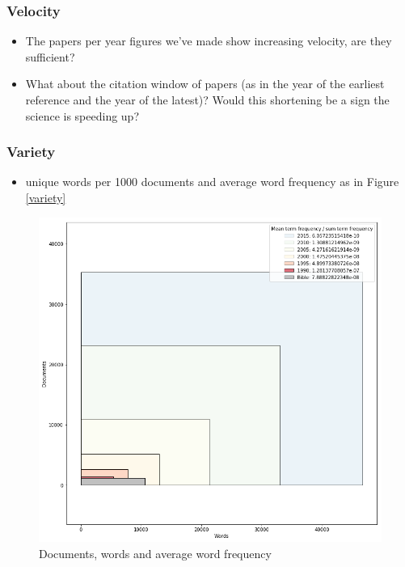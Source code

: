 \documentclass{article}
\begin{document}
\subsubsection*{Velocity}
\begin{itemize}
	\item The papers per year figures we've made show increasing velocity, are they sufficient?
    \item What about the citation window of papers (as in the year of the earliest reference and the year of the latest)? Would this shortening be a sign the science is speeding up?
\end{itemize}


\subsubsection*{Variety}

\begin{itemize}
	\item unique words per 1000 documents and average word frequency as in Figure \ref{variety}
\end{itemize}

\begin{figure}
\includegraphics[width=\linewidth]{plots/volume_variety_bible}
\caption{Documents, words and average word frequency}
\label{vsquare}
\end{figure}
\end{document}
